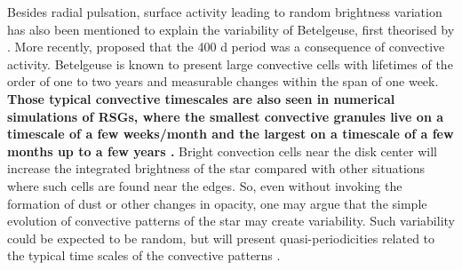 \documentclass{aa}
\begin{document}
Besides radial pulsation, surface activity leading to random brightness variation has also been mentioned to explain the variability of Betelgeuse, first theorised by \cite{schwarzschild_scale_1975}. More recently, \cite{gray_mass_2008} proposed that the 400 d period was a consequence of convective activity. Betelgeuse is known to present large convective cells with lifetimes of the order of one to two years \citep{lopez_ariste_convective_2018} and measurable changes 
within the span of one week. \textbf{Those typical convective timescales are also seen in numerical simulations of RSGs, where the smallest convective granules live on a timescale of a few weeks/month and the largest on a timescale of a few months up to a few years \citep{chiavassa_probing_2022}.} Bright convection cells near the disk center will increase the integrated brightness of the star compared with other situations where such cells are found near the edges. So, even without invoking the formation of 
dust or other changes in opacity, one may argue that the simple evolution of convective patterns of the star may create variability. Such 
variability could be expected to be random, but will present quasi-periodicities related to the typical time scales of the 
convective patterns \citep{gray_mass_2008}. \\
\end{document}
